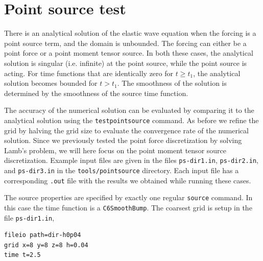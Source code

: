 \documentclass[11pt]{report}
\begin{document}
{%

\section{Point source test}\label{sec:testpointsource}

There is an analytical solution of the elastic wave equation when the forcing is a point source
term, and the domain is unbounded. The forcing can either be a point force or a point moment tensor
source. In both these cases, the analytical solution is singular (i.e. infinite) at the point source,
while the point source is acting. For time functions that are identically zero for $t\geq t_1$, the
analytical solution becomes bounded for $t>t_1$. The smoothness of the solution is determined by the
smoothness of the source time function.

The accuracy of the numerical solution can be evaluated by comparing it to the analytical solution
using the \verb+testpointsource+ command. As before we refine the grid by halving the grid size to
evaluate the convergence rate of the numerical solution. Since we previously tested the point force
discretization by solving Lamb's problem, we will here focus on the point moment tensor source
discretization. Example input files are given in the files \verb+ps-dir1.in+, \verb+ps-dir2.in+,
and \verb+ps-dir3.in+ in the \verb+tools/pointsource+ directory. Each input file has a corresponding
\verb+.out+ file with the results we obtained while running these cases.

The source properties are specified by exactly one regular \verb+source+ command. In this case the
time function is a \verb+C6SmoothBump+. The coarsest grid is setup in the file \verb+ps-dir1.in+,
\begin{verbatim}
fileio path=dir-h0p04
grid x=8 y=8 z=8 h=0.04
time t=2.5


\end{verbatim}}
\end{document}
